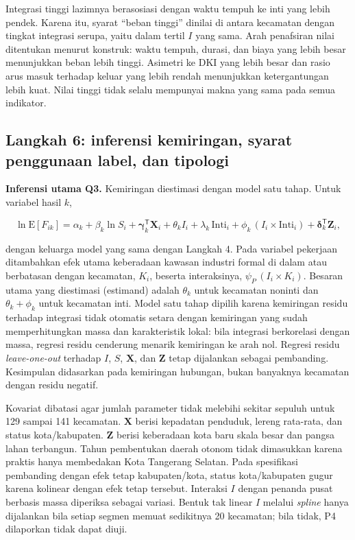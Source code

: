 \documentclass[12pt,a4paper,oneside,openany,indonesian]{report}
\begin{document}
Integrasi tinggi lazimnya berasosiasi dengan waktu tempuh ke inti yang
lebih pendek. Karena itu, syarat ``beban tinggi'' dinilai di antara
kecamatan dengan tingkat integrasi serupa, yaitu dalam tertil $I$ yang
sama. Arah penafsiran nilai ditentukan menurut konstruk: waktu tempuh,
durasi, dan biaya yang lebih besar menunjukkan beban lebih tinggi.
Asimetri ke DKI yang lebih besar dan rasio arus masuk terhadap keluar
yang lebih rendah menunjukkan ketergantungan lebih kuat. Nilai tinggi
tidak selalu mempunyai makna yang sama pada semua indikator.

\subsection{Langkah 6: inferensi kemiringan, syarat penggunaan label, dan
tipologi}\label{langkah-6-diagnosis-tipologi-dan-gradien}

\textbf{Inferensi utama Q3.} Kemiringan diestimasi dengan model satu
tahap. Untuk variabel hasil $k$,

\[
\ln \mathrm{E}[F_{ik}] = \alpha_k + \beta_k \ln S_i + \boldsymbol{\gamma}_k^{\mathsf T}\mathbf{X}_i + \theta_k I_i + \lambda_k\,\mathrm{Inti}_i + \phi_k\,(I_i \times \mathrm{Inti}_i) + \boldsymbol{\delta}_k^{\mathsf T}\mathbf{Z}_i ,
\]

\noindent dengan keluarga model yang sama dengan Langkah 4. Pada variabel
pekerjaan ditambahkan efek utama keberadaan kawasan industri formal di
dalam atau berbatasan dengan kecamatan, $K_i$, beserta interaksinya,
$\psi_P\,(I_i \times K_i)$. Besaran utama yang diestimasi (estimand) adalah $\theta_k$ untuk
kecamatan noninti dan $\theta_k + \phi_k$ untuk kecamatan inti. Model
satu tahap dipilih karena kemiringan residu terhadap integrasi tidak
otomatis setara dengan kemiringan yang sudah memperhitungkan massa dan
karakteristik lokal: bila integrasi berkorelasi dengan massa, regresi
residu cenderung menarik kemiringan ke arah nol. Regresi residu
\emph{leave-one-out} terhadap $I$, $S$, $\mathbf{X}$, dan $\mathbf{Z}$
tetap dijalankan sebagai pembanding. Kesimpulan didasarkan pada
kemiringan hubungan, bukan banyaknya kecamatan dengan residu negatif.

Kovariat dibatasi agar jumlah parameter tidak melebihi sekitar sepuluh
untuk 129 sampai 141 kecamatan. $\mathbf{X}$ berisi kepadatan
penduduk, lereng rata-rata, dan status kota/kabupaten. $\mathbf{Z}$
berisi keberadaan kota baru skala besar dan pangsa lahan terbangun.
Tahun pembentukan daerah otonom tidak dimasukkan karena praktis hanya
membedakan Kota Tangerang Selatan. Pada spesifikasi pembanding dengan
efek tetap kabupaten/kota, status kota/kabupaten gugur karena kolinear
dengan efek tetap tersebut. Interaksi $I$ dengan penanda pusat berbasis
massa diperiksa sebagai variasi. Bentuk tak linear $I$ melalui
\emph{spline} hanya dijalankan bila setiap segmen memuat sedikitnya 20
kecamatan; bila tidak, P4 dilaporkan tidak dapat diuji.
\end{document}
